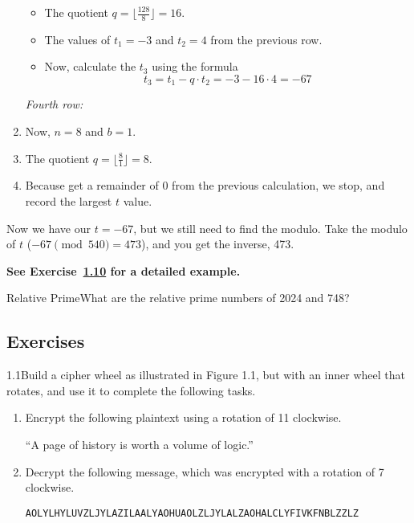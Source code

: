 \begin{enumerate}[label=\arabic*.]
\begin{itemize}
              \item The quotient \(q = \lfloor \frac{128}{8} \rfloor = 16\).
              \item The values of \(t_1 = -3\) and \(t_2 = 4\) from the previous row.
              \item Now, calculate the \(t_3\) using the formula
                    \[
                        t_3 = t_1 - q \cdot t_2 = -3 - 16 \cdot 4 = -67
                    \]
          \end{itemize}
          \textit{Fourth row:}
    \item Now, \(n = 8\) and \(b = 1\).
    \item The quotient \(q = \lfloor \frac{8}{1} \rfloor = 8\).
    \item Because get a remainder of 0 from the previous calculation, we stop, and record the largest \(t\) value.
\end{enumerate}
Now we have our \(t = -67\), but we still need to find the modulo. Take the modulo of \(t\) (\(-67 \pmod{540} = 473\)), and you get the inverse, 473.

\textbf{See Exercise~\hyperref[exerc:1.10]{1.10} for a detailed example.}

\begin{example}
    {Relative Prime}What are the relative prime numbers of 2024 and 748?
\end{example}


\renewcommand{\theenumi}{\alph{enumi}}
\renewcommand{\labelenumi}{(\theenumi)}
\subsection{Exercises}

\begin{exercise}
    {1.1}Build a cipher wheel as illustrated in Figure 1.1, but with an inner wheel that rotates, and use it to complete the following tasks.
    \begin{enumerate}
        \item Encrypt the following plaintext using a rotation of 11 clockwise.
              \begin{center}
                  ``A page of history is worth a volume of logic.''
              \end{center}
        \item Decrypt the following message, which was encrypted with a rotation of 7 clockwise.
              \begin{center}
                  \texttt{AOLYLHYLUVZLJYLAZILAALYAOHUAOLZLJYLALZAOHALCLYFIVKFNBLZZLZ}
              \end{center}
    \end{enumerate}
\end{exercise}

